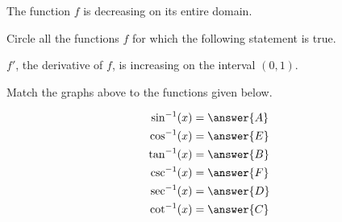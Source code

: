 \documentclass{ximera}
\begin{document}
\begin{exercise}
\begin{exercise}
The function $f$ is decreasing on its entire domain.

\begin{multipleChoice}
\end{multipleChoice}
\end{exercise}
\begin{exercise}
Circle all the functions $f$ for which the following statement is true.

$f'$, the derivative of $f$, is increasing on the interval $(0,1)$.

\begin{multipleChoice}
\end{multipleChoice}
\end{exercise}
\begin{exercise}

Match the  graphs above  to the functions given below.

\begin{align*}
\sin^{-1}(x) &= \answer{A}\\
\cos^{-1}(x) &= \answer{E}\\
\tan^{-1}(x) &= \answer{B}\\
\csc^{-1}(x) &= \answer{F}\\
\sec^{-1}(x) &= \answer{D}\\
\cot^{-1}(x) &= \answer{C}
\end{align*}

\end{exercise}
\end{exercise}
\end{document}
